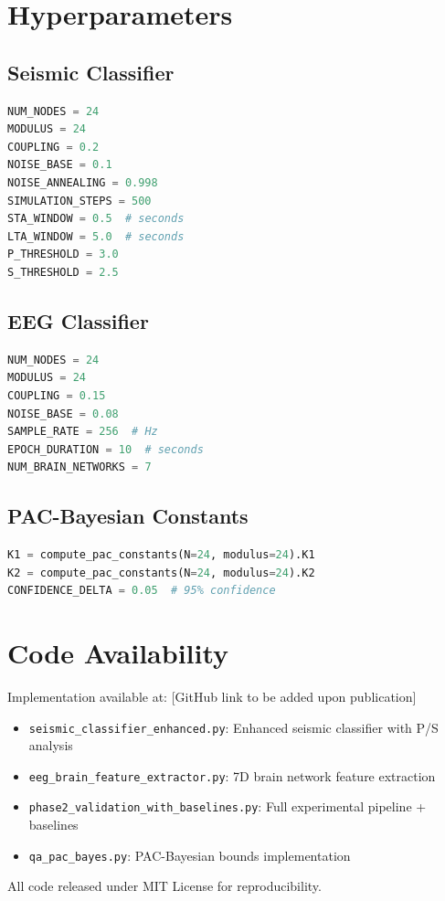 \documentclass[11pt]{article}
\theoremstyle{remark}
\begin{document}
\appendix

\section{Hyperparameters}

\subsection{Seismic Classifier}

\begin{lstlisting}[language=Python]
NUM_NODES = 24
MODULUS = 24
COUPLING = 0.2
NOISE_BASE = 0.1
NOISE_ANNEALING = 0.998
SIMULATION_STEPS = 500
STA_WINDOW = 0.5  # seconds
LTA_WINDOW = 5.0  # seconds
P_THRESHOLD = 3.0
S_THRESHOLD = 2.5
\end{lstlisting}

\subsection{EEG Classifier}

\begin{lstlisting}[language=Python]
NUM_NODES = 24
MODULUS = 24
COUPLING = 0.15
NOISE_BASE = 0.08
SAMPLE_RATE = 256  # Hz
EPOCH_DURATION = 10  # seconds
NUM_BRAIN_NETWORKS = 7
\end{lstlisting}

\subsection{PAC-Bayesian Constants}

\begin{lstlisting}[language=Python]
K1 = compute_pac_constants(N=24, modulus=24).K1
K2 = compute_pac_constants(N=24, modulus=24).K2
CONFIDENCE_DELTA = 0.05  # 95% confidence
\end{lstlisting}

\section{Code Availability}

Implementation available at: [GitHub link to be added upon publication]

\begin{itemize}
\item \texttt{seismic\_classifier\_enhanced.py}: Enhanced seismic classifier with P/S analysis
\item \texttt{eeg\_brain\_feature\_extractor.py}: 7D brain network feature extraction
\item \texttt{phase2\_validation\_with\_baselines.py}: Full experimental pipeline + baselines
\item \texttt{qa\_pac\_bayes.py}: PAC-Bayesian bounds implementation
\end{itemize}

All code released under MIT License for reproducibility.
\end{document}
